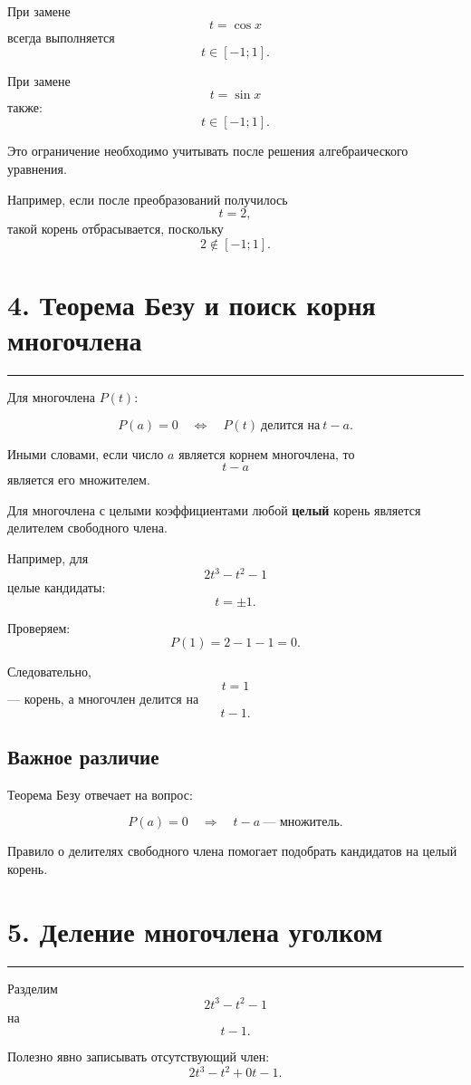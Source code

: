 \documentclass[a4paper,12pt]{article}
\newcommand{\sectionline}{%
    \vspace{0.2em}
    \noindent\color{linegray}\rule{\linewidth}{0.6pt}
    \vspace{0.4em}
}
\begin{document}
При замене
\[
t=\cos x
\]
всегда выполняется
\[
t\in[-1;1].
\]

При замене
\[
t=\sin x
\]
также:
\[
t\in[-1;1].
\]

Это ограничение необходимо учитывать после решения алгебраического уравнения.

Например, если после преобразований получилось
\[
t=2,
\]
такой корень отбрасывается, поскольку
\[
2\notin[-1;1].
\]

\section*{\color{darkaccent}4. Теорема Безу и поиск корня многочлена}
\sectionline

Для многочлена \(P(t)\):

\[
P(a)=0
\quad\Longleftrightarrow\quad
P(t)\ \text{делится на}\ t-a.
\]

Иными словами, если число \(a\) является корнем многочлена, то
\[
t-a
\]
является его множителем.

Для многочлена с целыми коэффициентами любой \textbf{целый} корень является делителем свободного члена.

Например, для
\[
2t^3-t^2-1
\]
целые кандидаты:
\[
t=\pm1.
\]

Проверяем:
\[
P(1)=2-1-1=0.
\]

Следовательно,
\[
t=1
\]
--- корень, а многочлен делится на
\[
t-1.
\]

\subsection*{\color{accent}Важное различие}

Теорема Безу отвечает на вопрос:

\[
P(a)=0
\quad\Rightarrow\quad
t-a\ \text{--- множитель}.
\]

Правило о делителях свободного члена помогает подобрать кандидатов на целый корень.

\section*{\color{darkaccent}5. Деление многочлена уголком}
\sectionline

Разделим
\[
2t^3-t^2-1
\]
на
\[
t-1.
\]

Полезно явно записывать отсутствующий член:
\[
2t^3-t^2+0t-1.
\]
\end{document}
